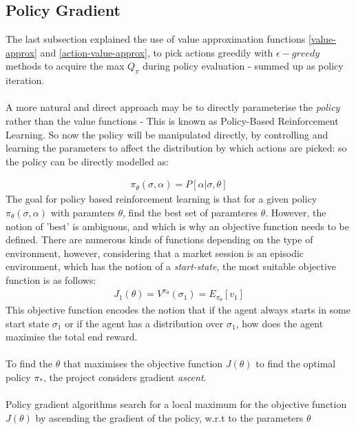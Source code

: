 \documentclass[ %
                    author={Ashwinder Khurana},
                supervisor={Prof Dave Cliff},
                    degree={MEng},
                     title={The Deeply Reinforced Trader},
                  subtitle={},
                      type={enterprise},
                      year={2020} ]{dissertation}
\begin{document}
{\subsection{Policy Gradient}
The last subsection explained the use of value approximation functions \ref{value-approx} and \ref{action-value-approx}, to pick actions greedily with $\epsilon-greedy$ methods to acquire the max $Q_\pi$ during policy evaluation - summed up as policy iteration. 
\\
\\
A more natural and direct approach may be to directly parameterise the \textit{policy} rather than the value functions - This is known as Policy-Based Reinforcement Learning. So now the policy will be manipulated directly, by controlling and learning the parameters to affect the distribution by which actions are picked: so the policy can be directly modelled as:

\begin{equation}
\label{Policy Gradient}
\begin{split}
\pi_\theta(\sigma, \alpha) = P[\alpha | \sigma, \theta]
\end{split}
\end{equation}
\noindent
The goal for policy based reinforcement learning is that for a given policy $\pi_\theta(\sigma,\alpha)$ with paramters $\theta$, find the best set of paramteres $\theta$. However, the notion of 'best' is ambiguous, and  which is why an objective function needs to be defined. There are numerous kinds of functions depending on the type of environment, however, considering that a market session is an episodic environment, which has the notion of a \textit{start-state}, the most suitable objective function is as follows: 
\begin{equation}
\label{Policy Gradient}
\begin{split}
J_1(\theta) = V^{\pi_\theta}(\sigma_1) = E_{\pi_\theta} [v_1]
\end{split}
\end{equation}
\noindent
This objective function encodes the notion that if the agent always starts in some start state $\sigma_1$ or if the agent has a distribution over $\sigma_1$, how does the agent maximise the total end reward.
\\
\\
To find the $\theta$ that maximises the objective function $J(\theta)$ to find the optimal policy $\pi_*$, the project considers gradient \textit{ascent}. 
\\
\\
Policy gradient algorithms search for a local maximum for the objective function $J(\theta)$ by ascending the gradient of the policy, w.r.t to the parameters $\theta$ 

}
\end{document}
